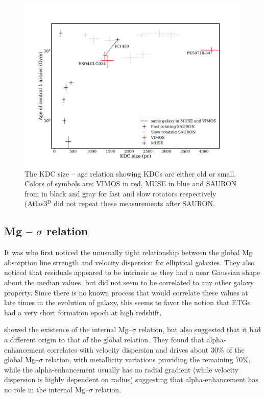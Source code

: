 		\begin{figure}
			\centering
			\includegraphics[width=.8\textwidth]{chapter4/KDC_size_age.png}
			\caption[KDC dichotomy]{The KDC size -- age relation showing KDCs are either old or small. Colors of symbols are: VIMOS in red, MUSE in blue and SAURON from \citet{Kuntschner2010} in black and gray for fast and slow rotators respectively (Atlas3$^\text{D}$ did not repeat these measurements after SAURON.}
			\label{fig:KDC}
		\end{figure}


	\subsection{Mg -- $\sigma$ relation}
		\label{subsec:Mgsigma}

		It was \citet{Bender1993} who first noticed the unusually tight relationship between the global Mg absorption line strength and velocity dispersion for elliptical galaxies. They also noticed that residuals appeared to be intrinsic as they had a near Gaussian shape about the median values, but did not seem to be correlated to any other galaxy property. Since there is no known process that would correlate these values at late times in the evolution of galaxy, this seems to favor the notion that ETGs had a very short formation epoch at high redshift. 

		\citet{Mehlert2003} showed the existence of the internal Mg--$\mathrm{\sigma}$ relation, but also suggested that it had a different origin to that of the global relation. They found that alpha-enhancement correlates with velocity dispersion and drives about 30\% of the global Mg--$\sigma$ relation, with metallicity variations providing the remaining 70\%, while the alpha-enhancement usually has no radial gradient (while velocity dispersion is highly dependent on radius) suggesting that alpha-enhancement has no role in the internal Mg--$\sigma$ relation. 

